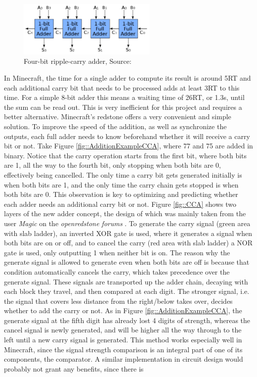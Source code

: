 \begin{figure}
    \begin{center}
        \includegraphics[width=0.6\textwidth]{Figures/RippleCarryAdderWikipedia.png}
        \caption[Ripple-Carry Adder]{Four-bit ripple-carry adder, Source: \cite{RCC_Wiki}}
        \label{fig::RippleCarryAdder}
    \end{center}
\end{figure}

In Minecraft, the time for a single adder to compute its result is around 5RT and each additional carry bit that needs to be processed adds at least 3RT to this time. For a simple 8-bit adder this means a waiting time of 26RT, or 1.3s, until the sum can be read out. This is very inefficient for this project and requires a better alternative. Minecraft's redstone offers a very convenient and simple solution. To improve the speed of the addition, as well as synchronize the outputs, each full adder needs to know beforehand whether it will receive a carry bit or not. Take Figure \ref{fig::AdditionExampleCCA}, where 77 and 75 are added in binary. Notice that the carry operation starts from the first bit, where both bits are 1, all the way to the fourth bit, only stopping when both bits are 0, effectively being cancelled. The only time a carry bit gets generated initially is when both bits are 1, and the only time the carry chain gets stopped is when both bits are 0. This observation is key to optimizing and predicting whether each adder needs an additional carry bit or not. Figure \ref{fig::CCA} shows two layers of the new adder concept, the design of which was mainly taken from the user \textit{Magic} on the \textit{openredstone forums} \cite{CCA_OpenRedstone}. To generate the carry signal (green area with slab ladder), an inverted XOR gate  is used, where it generates a signal when both bits are on or off, and to cancel the carry (red area with slab ladder) a NOR gate is used, only outputting 1 when neither bit is on. The reason why the generate signal is allowed to generate even when both bits are off is because that condition automatically cancels the carry, which takes precedence over the generate signal. These signals are transported up the adder chain, decaying with each block they travel, and then compared at each digit. The stronger signal, i.e. the signal that covers less distance from the right/below takes over, decides whether to add the carry or not. As in Figure \ref{fig::AdditionExampleCCA}, the generate signal at the fifth digit has already lost 4 digits of strength, whereas the cancel signal is newly generated, and will be higher all the way through to the left until a new carry signal is generated. This method works especially well in Minecraft, since the signal strength comparison is an integral part of one of its components, the comparator. A similar implementation in circuit design would probably not grant any benefits, since there is 